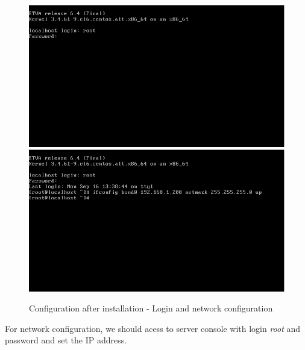 \begin{figure}[H]
	\begin{center}
    \includegraphics[scale=0.3]{screenshots/install/nuxis/login.png}
    \includegraphics[scale=0.3]{screenshots/install/nuxis/configure_network.png}
    \caption{Configuration after installation - Login and network configuration}
	\label{fig:installation_enterprise_pos_02}
	\end{center}
\end{figure}

For network configuration, we should acess to server console with login \emph{root} and password and set the IP address.

